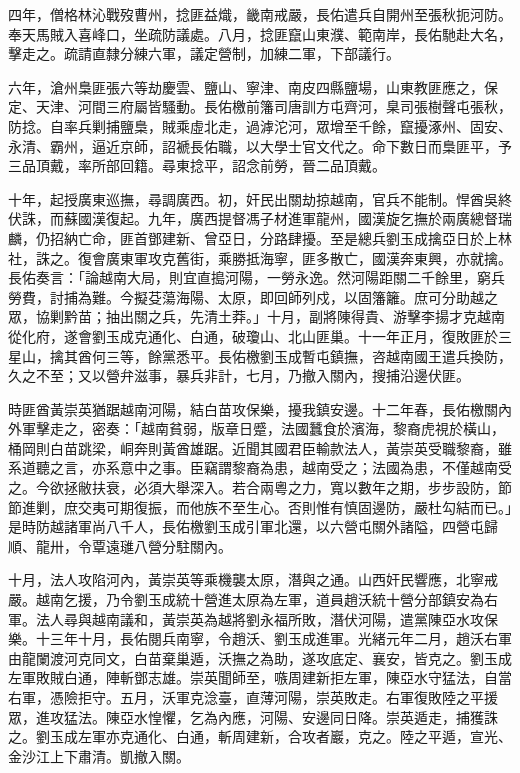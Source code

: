 \begin{pinyinscope}
四年，僧格林沁戰歿曹州，捻匪益熾，畿南戒嚴，長佑遣兵自開州至張秋扼河防。奉天馬賊入喜峰口，坐疏防議處。八月，捻匪竄山東濮、範南岸，長佑馳赴大名，擊走之。疏請直隸分練六軍，議定營制，加練二軍，下部議行。

六年，滄州梟匪張六等劫慶雲、鹽山、寧津、南皮四縣鹽場，山東教匪應之，保定、天津、河間三府屬皆騷動。長佑檄前籓司唐訓方屯齊河，臬司張樹聲屯張秋，防捻。自率兵剿捕鹽梟，賊乘虛北走，過滹沱河，眾增至千餘，竄擾涿州、固安、永清、霸州，逼近京師，詔褫長佑職，以大學士官文代之。命下數日而梟匪平，予三品頂戴，率所部回籍。尋東捻平，詔念前勞，晉二品頂戴。

十年，起授廣東巡撫，尋調廣西。初，奸民出關劫掠越南，官兵不能制。悍酋吳終伏誅，而蘇國漢復起。九年，廣西提督馮子材進軍龍州，國漢旋乞撫於兩廣總督瑞麟，仍招納亡命，匪首鄧建新、曾亞日，分路肆擾。至是總兵劉玉成擒亞日於上林社，誅之。復會廣東軍攻克舊街，乘勝抵海寧，匪多散亡，國漢奔東興，亦就擒。長佑奏言：「論越南大局，則宜直搗河陽，一勞永逸。然河陽距關二千餘里，窮兵勞費，討捕為難。今擬芟蕩海陽、太原，即回師列戍，以固籓籬。庶可分助越之眾，協剿黔苗；抽出關之兵，先清土莽。」十月，副將陳得貴、游擊李揚才克越南從化府，遂會劉玉成克通化、白通，破瓊山、北山匪巢。十一年正月，復敗匪於三星山，擒其酋何三等，餘黨悉平。長佑檄劉玉成暫屯鎮撫，咨越南國王遣兵換防，久之不至；又以營弁滋事，暴兵非計，七月，乃撤入關內，搜捕沿邊伏匪。

時匪酋黃崇英猶踞越南河陽，結白苗攻保樂，擾我鎮安邊。十二年春，長佑檄關內外軍擊走之，密奏：「越南貧弱，版章日蹙，法國蠶食於濱海，黎裔虎視於橫山，桶岡則白苗跳梁，峒奔則黃酋雄踞。近聞其國君臣輸款法人，黃崇英受職黎裔，雖系道聽之言，亦系意中之事。臣竊謂黎裔為患，越南受之；法國為患，不僅越南受之。今欲拯敝扶衰，必須大舉深入。若合兩粵之力，寬以數年之期，步步設防，節節進剿，庶交夷可期復振，而他族不至生心。否則惟有慎固邊防，嚴杜勾結而已。」是時防越諸軍尚八千人，長佑檄劉玉成引軍北還，以六營屯關外諸隘，四營屯歸順、龍卅，令覃遠璡八營分駐關內。

十月，法人攻陷河內，黃崇英等乘機襲太原，潛與之通。山西奸民響應，北寧戒嚴。越南乞援，乃令劉玉成統十營進太原為左軍，道員趙沃統十營分部鎮安為右軍。法人尋與越南議和，黃崇英為越將劉永福所敗，潛伏河陽，遣黨陳亞水攻保樂。十三年十月，長佑閱兵南寧，令趙沃、劉玉成進軍。光緒元年二月，趙沃右軍由龍闌渡河克同文，白苗棄巢遁，沃撫之為助，遂攻底定、襄安，皆克之。劉玉成左軍敗賊白通，陣斬鄧志雄。崇英聞師至，嗾周建新拒左軍，陳亞水守猛法，自當右軍，憑險拒守。五月，沃軍克淰臺，直薄河陽，崇英敗走。右軍復敗陸之平援眾，進攻猛法。陳亞水惶懼，乞為內應，河陽、安邊同日降。崇英遁走，捕獲誅之。劉玉成左軍亦克通化、白通，斬周建新，合攻者巖，克之。陸之平遁，宣光、金沙江上下肅清。凱撤入關。


\end{pinyinscope}
